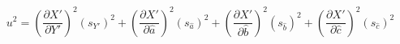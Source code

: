 \documentclass[12pt]{article}
\begin{document}
\pagestyle{empty}
\Large
{}
\pagecolor{ehandbook}


\[
u^{2} = \left( \frac{\partial{X'}}{\partial{Y'}}\right) ^{2} (s_{Y'})^{2} + 
\left( \frac{\partial{X'}}{\partial{\hat{a}}}\right) ^{2} (s_{\hat{a}})^{2} + 
\left( \frac{\partial{X'}}{\partial{\hat{b}}}\right) ^{2} (s_{\hat{b}})^{2} +
\left( \frac{\partial{X'}}{\partial{\hat{c}}}\right )^{2} (s_{\hat{c}})^{2}
\]
\end{document}
